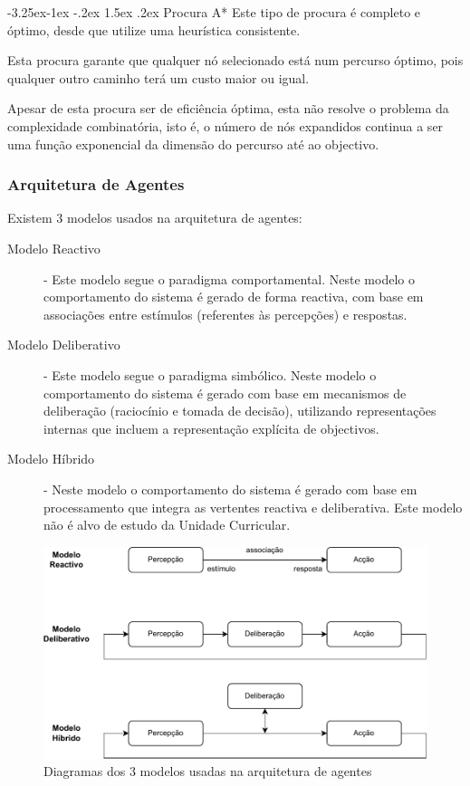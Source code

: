 \documentclass[a4paper,12pt]{article}
\makeatletter
\renewcommand\subparagraph{\@startsection{subparagraph}{5}{\z@}%
                {-3.25ex\@plus -1ex \@minus -.2ex}%
                {1.5ex \@plus .2ex}%
                {\normalfont\normalsize\bfseries}}
\makeatother
\begin{document}
\subparagraph{Procura A*}
Este tipo de procura é completo e óptimo, desde que utilize uma heurística consistente.

Esta procura garante que qualquer nó selecionado está num percurso óptimo, pois qualquer outro caminho terá um custo maior ou igual.

Apesar de esta procura ser de eficiência óptima, esta não resolve o problema da complexidade combinatória, isto é, o número de nós expandidos continua a ser uma função exponencial da dimensão do percurso até ao objectivo.

\subsubsection{Arquitetura de Agentes} \label{arquitetura_de_agentes}
Existem 3 modelos usados na arquitetura de agentes:
\begin{description}
	\item[Modelo Reactivo] - Este modelo segue o paradigma comportamental. Neste modelo o comportamento do sistema é gerado de forma reactiva, com base em associações entre estímulos (referentes às percepções) e respostas.
	\item[Modelo Deliberativo] - Este modelo segue o paradigma simbólico. Neste modelo o comportamento do sistema é gerado com base em mecanismos de deliberação (raciocínio e tomada de decisão), utilizando representações internas que incluem a representação explícita de objectivos.
	\item[Modelo Híbrido] - Neste modelo o comportamento do sistema é gerado com base em processamento que integra as vertentes reactiva e deliberativa. Este modelo não é alvo de estudo da Unidade Curricular.
\end{description}


\begin{figure}[h]
\centering
\includegraphics[scale=0.8]{modelos}
\caption{Diagramas dos 3 modelos usadas na arquitetura de agentes}
\end{figure}
\end{document}
